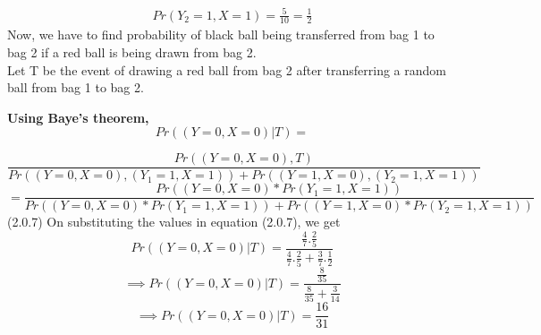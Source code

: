 \documentclass[journal,12pt,twocolumn]{IEEEtran}
\begin{document}
\begin{enumerate}
\begin{align}
    Pr(Y_2=1,X=1)=\frac{5}{10}=\frac{1}{2}
\end{align}
Now, we have to find probability of black ball being transferred from bag 1 to bag 2 if a red ball is being drawn from bag 2.\\
Let T be the event of drawing a red ball from bag 2 after transferring a random ball from bag 1 to bag 2.

\textbf{Using Baye's theorem,}
\[Pr((Y=0,X=0)|T)=\]

{\tiny 
\[\frac{Pr((Y=0,X=0),T)}{Pr((Y=0,X=0),(Y_1=1,X=1))+Pr((Y=1,X=0),(Y_2=1,X=1))}\]}
{\tiny 
\[=\frac{Pr((Y=0,X=0)*Pr(Y_1=1,X=1))}{Pr((Y=0,X=0)*Pr(Y_1=1,X=1))+Pr((Y=1,X=0)*Pr(Y_2=1,X=1))}\]}
\hspace{6.7cm}(2.0.7)
On substituting the values in equation (2.0.7), we get
\[Pr((Y=0,X=0)|T)=\frac{\frac{4}{7}.\frac{2}{5}}{\frac{4}{7}.\frac{2}{5}+\frac{3}{7}.\frac{1}{2}}\]
\[\implies Pr((Y=0,X=0)|T)  =\frac{\frac{8}{35}}{\frac{8}{35}+\frac{3}{14}}\]
\[\implies  Pr((Y=0,X=0)|T)=\frac{16}{31}\]

\end{enumerate}
\end{document}
